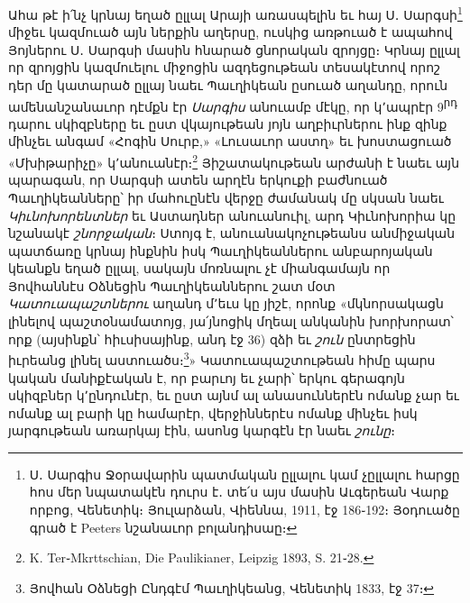\documentclass{article}
\begin{document}
{Ահա թէ ի՛նչ կրնայ եղած ըլլալ Արայի առասպելին եւ հայ Ս․ Սարգսի\footnote{Ս․ Սարգիս Ջօրավարին պատմական ըլլալու կամ չըլլալու հարցը հոս մեր նպատակէն դուրս է․ տե՛ս այս մասին Աւգերեան Վարք որբոց, Վենետիկ։ Յուլարձան, Վիեննա, 1911, էջ 186֊192։ Յօդուածը գրած է Peeters նշանաւոր բոլանդիսաը։} միջեւ կազմուած այն ներքին աղերսը, ուսկից առթուած է ապահով Յոյներու Ս․ Սարգսի մասին հնարած ցնորական զրոյցը։ Կրնայ ըլլալ որ զրոյցին կազմուելու միջոցին ազդեցութեան տեսակէտով որոշ դեր մը կատարած ըլլայ նաեւ Պաւղիկեան ըսուած աղանդը, որուն ամենանշանաւոր դէմքն էր \emph{Սարգիս} անուամբ մէկը, որ կ՚ապրէր 9\textsuperscript{րդ} դարու սկիզբները եւ ըստ վկայութեան յոյն աղբիւրներու ինք զինք մինչեւ անգամ «Հոգին Սուրբ,» «Լուսաւոր աստղ» եւ խոստացուած «Մխիթարիչը» կ՚անուանէր։\footnote{K. Ter֊Mkrttschian, Die Paulikianer, Leipzig 1893, S. 21֊28.} Յիշատակութեան արժանի է նաեւ այն պարագան, որ Սարգսի ատեն արղէն երկուքի բաժնուած Պաւղիկեանները՝ իր մահուընէն վերջը ժամանակ մը սկսան նաեւ \emph{Կիւնոխորենտներ} եւ Աստադներ անուանուիլ, արդ Կիւնոխորիա կը նշանակէ \emph{շնորջական}։ Ստոյգ է, անուանակոչութեանս անմիջական պատճառը կրնայ ինքնին իսկ Պաւղիկեաններու անբարոյական կեանքն եղած ըլլալ, սակայն մոռնալու չէ միանգամայն որ Յովհաննէս Օձնեցին Պաւղիկեաններու շատ մօտ \emph{Կատուապաշտներու} աղանդ մ՚եւս կը յիշէ, որոնք «մկնորսակացն լինելով պաշտօնամատոյց, յա՛յնոցիկ մղեալ անկանին խորխորատ՝ որք (այսինքն՝ հիւսիսայինք, անդ էջ 36) զձի եւ \emph{շուն} ընտրեցին իւրեանց լինել աստուածս։\footnote{Յովհան Օձնեցի Ընդգէմ Պաւղիկեանց, Վենետիկ 1833, էջ 37։}» Կատուապաշտութեան հիմը պարս կական մանիքէական է, որ բարւոյ եւ չարի՝ երկու գերագոյն սկիզբներ կ՚ընդունէր, եւ ըստ այնմ ալ անասուններէն ոմանք չար եւ ոմանք ալ բարի կը համարէր, վերջիններէս ոմանք մինչեւ իսկ յարգութեան առարկայ էին, ասոնց կարգէն էր նաեւ \emph{շունը}։

}
\end{document}
